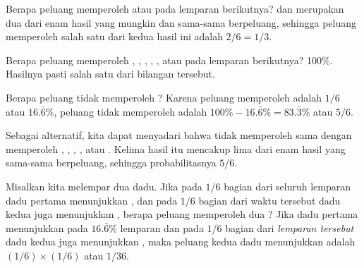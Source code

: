 \begin{examplewrap}
\begin{nexample}{Berapa peluang memperoleh  atau  pada lemparan berikutnya?}\label{probOf1Or2}
 dan  merupakan dua dari enam hasil yang mungkin dan sama-sama berpeluang, sehingga peluang memperoleh salah satu dari kedua hasil ini adalah $2/6 = 1/3$.
\end{nexample}
\end{examplewrap}

\begin{examplewrap}
\begin{nexample}{Berapa peluang memperoleh , , , , , atau  pada lemparan berikutnya?}\label{probOf123456}
100\%. Hasilnya pasti salah satu dari bilangan tersebut.
\end{nexample}
\end{examplewrap}

\begin{examplewrap}
\begin{nexample}{Berapa peluang tidak memperoleh ?}\label{probNot2}
Karena peluang memperoleh  adalah $1/6$ atau $16.\bar{6}\%$, peluang tidak memperoleh  adalah $100\% - 16.\bar{6}\%=83.\bar{3}\%$ atau $5/6$.

Sebagai alternatif, kita dapat menyadari bahwa tidak memperoleh  sama dengan memperoleh , , , , atau . Kelima hasil itu mencakup lima dari enam hasil yang sama-sama berpeluang, sehingga probabilitasnya $5/6$.
\end{nexample}
\end{examplewrap}

\begin{examplewrap}
\begin{nexample}{Misalkan kita melempar dua dadu. Jika pada $1/6$ bagian dari seluruh lemparan dadu pertama menunjukkan , dan pada $1/6$ bagian dari waktu tersebut dadu kedua juga menunjukkan , berapa peluang memperoleh dua ?}\label{probOf2Ones}
Jika dadu pertama menunjukkan  pada $16.\bar{6}$\% lemparan dan pada $1/6$ bagian dari \emph{lemparan tersebut} dadu kedua juga menunjukkan , maka peluang kedua dadu menunjukkan  adalah $(1/6)\times (1/6)$ atau $1/36$.
\end{nexample}
\end{examplewrap}


\D{\newpage}

